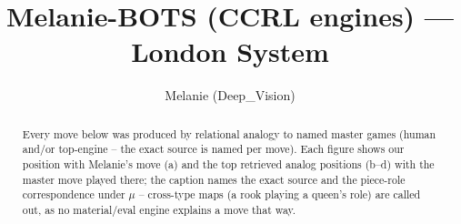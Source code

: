 \documentclass[11pt]{article}
\title{Melanie-BOTS (CCRL engines) — London System}
\author{Melanie (Deep\_Vision)}
\date{}
\begin{document}
\maketitle

\begin{abstract}Every move below was produced by relational analogy to named master games (human and/or top-engine -- the exact source is named per move). Each figure shows our position with Melanie's move (a) and the top retrieved analog positions (b--d) with the master move played there; the caption names the exact source and the piece-role correspondence under $\mu$ -- cross-type maps (a rook playing a queen's role) are called out, as no material/eval engine explains a move that way.\end{abstract}

\begin{figure}[p]\centering
\begin{subfigure}{0.46\textwidth}\centering
\resizebox{\linewidth}{!}{%
\newchessgame
\chessboard[
  setfen={rnbq1rk1/pp3ppp/3bpn2/2pp4/3P4/3BPNB1/PPP2PPP/RN1QK2R w KQ - 0 7},
  showmover=false,
  pgfstyle=straightmove, color=movearrow, markmove={g3-h4}
]}
\caption{}
\end{subfigure}\hfill
\begin{subfigure}{0.46\textwidth}\centering
\resizebox{\linewidth}{!}{%
\newchessgame
\chessboard[
  setfen={rn1qk2r/ppp1bpp1/4pn1p/3p1b2/4P3/3P2P1/PPPN1PBP/RNBQ1RK1 b kq - 0 7},
  showmover=false,
  pgfstyle=straightmove, color=movearrow, markmove={f5-g6}
]}
\caption{}
\end{subfigure}
\\[4pt]
\begin{subfigure}{0.46\textwidth}\centering
\resizebox{\linewidth}{!}{%
\newchessgame
\chessboard[
  setfen={rn1qk2r/ppp1bpp1/4pn1p/3p1b2/4P3/3P2P1/PPPN1PBP/RNBQ1RK1 b kq - 0 7},
  showmover=false,
  pgfstyle=straightmove, color=movearrow, markmove={f5-g6}
]}
\caption{}
\end{subfigure}\hfill
\begin{subfigure}{0.46\textwidth}\centering
\resizebox{\linewidth}{!}{%
\newchessgame
\chessboard[
  setfen={rn1qk2r/ppp1bpp1/4pn1p/3p1b2/4P3/3P2P1/PPPN1PBP/RNBQ1RK1 b kq - 0 7},
  showmover=false,
  pgfstyle=straightmove, color=movearrow, markmove={f5-g6}
]}
\caption{}
\end{subfigure}

\end{figure}
\end{document}
